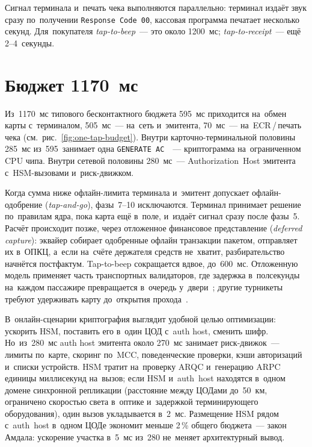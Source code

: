 Сигнал терминала и~печать чека выполняются параллельно: терминал издаёт звук
сразу по~получении \texttt{Response~Code~00}, кассовая программа печатает
несколько секунд. Для~покупателя \textit{tap-to-beep}~--- это около
1200~мс; \textit{tap-to-receipt}~--- ещё 2--4~секунды.

\section{Бюджет 1170~мс}\label{sec:one-tap-budget}

Из~1170~мс типового бесконтактного бюджета 595~мс приходится на~обмен карты
с~терминалом, 505~мс~--- на~сеть и~эмитента, 70~мс~--- на~ECR\,/\,печать чека
(см.~рис.~\ref{fig:one-tap-budget}).
Внутри карточно-терминальной половины 285~мс из~595~занимает одна
\texttt{GENERATE~AC}~\cite{lifecycleintegrity-emv-timing}~--- криптограмма на~ограниченном CPU чипа. Внутри сетевой
половины 280~мс~--- Authorization~Host эмитента с~HSM-вызовами и~риск-движком.

Когда сумма ниже офлайн-лимита терминала и~эмитент допускает офлайн-одобрение
(\textit{tap-and-go}), фазы~7--10 исключаются. Терминал принимает
решение по~правилам ядра, пока карта ещё в~поле, и~издаёт сигнал сразу после
фазы~5. Расчёт происходит позже, через отложенное финансовое представление
(\textit{deferred capture}): эквайер собирает одобренные офлайн транзакции
пакетом, отправляет их в~ОПКЦ, а~если на~счёте держателя средств не~хватит,
разбирательство начнётся постфактум. Tap-to-beep сокращается вдвое,
до~600~мс. Отложенную модель применяет часть транспортных валидаторов,
где задержка в~полсекунды на~каждом пассажире превращается в~очередь
у~двери~\cite{uspf-transit-2018}; другие турникеты требуют
удерживать карту до~открытия прохода~\cite{tbank-transit-pay-help}.

В~онлайн-сценарии криптография выглядит удобной целью оптимизации: ускорить HSM,
поставить его в~один ЦОД с~auth host, сменить шифр. Но~из~280~мс auth host
эмитента около 270~мс занимает риск-движок~--- лимиты по~карте, скоринг по~MCC,
поведенческие проверки, кэши авторизаций и~списки устройств. HSM тратит на~проверку
ARQC и~генерацию ARPC единицы миллисекунд на~вызов; если HSM и~auth~host
находятся в~одном домене синхронной репликации (расстояние между ЦОДами
  до~50~км, ограничено скоростью света в~оптике и~задержкой терминирующего
оборудования), один вызов укладывается в~2~мс. Размещение HSM рядом
с~auth~host в~одном ЦОДе экономит меньше 2\,\% общего бюджета~--- закон Амдала:
ускорение участка в~5~мс из~280 не~меняет архитектурный вывод.

